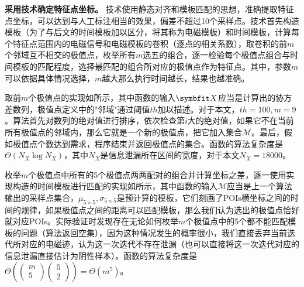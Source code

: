 {{	%
	
	\textbf{采用\yuchuli 技术确定特征点坐标。}
	\yuchuli 技术使用静态对齐和模板匹配的思想，准确提取特征点坐标，可以达到与人工标注相当的效果，偏差不超过10个采样点。\yuchuli 技术首先构造模板（为了与后文的时间模板加以区分，将其称为电磁模板）和时间模板，计算每个特征点范围内的电磁信号和电磁模板的卷积（逐点的相关系数），取卷积的前$m$个邻域互不相交的极值点，枚举所有$m$选五的组合，逐一检验每个极值点组合与时间模板的匹配程度，选择最匹配的组合所对应的极值点作为特征点。其中，参数$m$可以依据具体情况选择，$m$越大那么执行时间越长，结果也越准确。
	
	取前$m$个极值点的实现如所示，其中函数的输入$\Vector X$应当是计算出的协方差数列，极值点定义中的"邻域"通过阈值$th$加以描述。对于本文，$th=100,m=9$。算法首先对数列的绝对值进行排序，依次检查第$i$大的绝对值，如果它不在当前所有极值点的邻域内，那么它就是一个新的极值点，把它加入集合$\mathcal M$。最后，假如极值点个数达到需求，程序结束并返回极值点的集合。函数的算法复杂度是$\Theta(N_X\log N_X)$，其中$N_X$是信息泄漏所在区间的宽度，对于本文$N_X=18000$。
	
	枚举$m$个极值点中所有的5个极值点两两配对的组合并计算坐标之差，逐一使用实现构造的时间模板进行匹配的实现如所示，其中函数的输入$\mathcal M$应当是上一个算法输出的采样点集合，$\mu_{5\times5},\sigma_{5\times5}$是预计算的模板，它们刻画了POIs横坐标之间的时间的规律，如果极值点之间的距离可以匹配模板，那么我们认为选出的极值点恰好就对应POIs。实际验证时发现存在无论如何枚举$m$个极值点中的5个都不能匹配模板的问题（算法返回空集），因为这种情况发生的概率很小，我们直接丢弃当前迭代所对应的电磁迹，认为这一次迭代不存在泄漏（也可以直接将这一次迭代对应的信息泄漏直接估计为阴性样本）。函数的算法复杂度是$\Theta\left( \begin{pmatrix}m\\5\end{pmatrix}\begin{pmatrix}5\\2\end{pmatrix}\right) =\Theta(m^5)$。
	
}}
